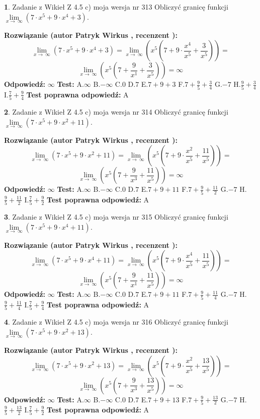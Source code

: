 \documentclass[12pt, a4paper]{article}
\theoremstyle{definition} %
\newtheorem{zad}{}
\newcommand{\zadStart}[1]{\begin{zad}#1\newline}
\newcommand{\zadStop}{\end{zad}}
\newcommand{\rozwStart}[2]{\noindent \textbf{Rozwiązanie (autor #1 , recenzent #2): }\newline}
\newcommand{\rozwStop}{\newline}
\newcommand{\odpStart}{\noindent \textbf{Odpowiedź:}\newline}
\newcommand{\odpStop}{\newline}
\newcommand{\testStart}{\noindent \textbf{Test:}\newline}
\newcommand{\testStop}{\newline}
\newcommand{\kluczStart}{\noindent \textbf{Test poprawna odpowiedź:}\newline}
\newcommand{\kluczStop}{\newline}
\begin{document}
\zadStart{Zadanie z Wikieł Z 4.5 c) moja wersja nr 313}
Obliczyć granicę funkcji  $\lim\limits_{x\to\ \infty}(7 \cdot x^{5}+9 \cdot x^{4}+3)$.
\zadStop
\rozwStart{Patryk Wirkus}{}
$$\lim\limits_{x\to\ \infty}(7 \cdot x^{5}+9 \cdot x^{4}+3) = \lim\limits_{x\to\ \infty}(x^{5}(7 +9 \cdot \frac{x^{4}}{x^{5}}+\frac{3}{x^{5}})) =$$ $$\lim\limits_{x\to\ \infty}(x^{5}(7 +\frac{9}{x^{1}}+\frac{3}{x^{5}})) =\infty$$
\rozwStop
\odpStart
$\infty$
\odpStop
\testStart
A.$\infty$ B.$-\infty$ C.$0$ D.$7$ E.$7 + 9 + 3$
F.$7+\frac{9}{5}+\frac{3}{4}$ G.$-7$
H.$\frac{9}{5}+\frac{3}{4}$
I.$\frac{7}{5}+\frac{9}{4}$
\testStop
\kluczStart
A
\kluczStop



\zadStart{Zadanie z Wikieł Z 4.5 c) moja wersja nr 314}
Obliczyć granicę funkcji  $\lim\limits_{x\to\ \infty}(7 \cdot x^{5}+9 \cdot x^{2}+11)$.
\zadStop
\rozwStart{Patryk Wirkus}{}
$$\lim\limits_{x\to\ \infty}(7 \cdot x^{5}+9 \cdot x^{2}+11) = \lim\limits_{x\to\ \infty}(x^{5}(7 +9 \cdot \frac{x^{2}}{x^{5}}+\frac{11}{x^{5}})) =$$ $$\lim\limits_{x\to\ \infty}(x^{5}(7 +\frac{9}{x^{3}}+\frac{11}{x^{5}})) =\infty$$
\rozwStop
\odpStart
$\infty$
\odpStop
\testStart
A.$\infty$ B.$-\infty$ C.$0$ D.$7$ E.$7 + 9 + 11$
F.$7+\frac{9}{5}+\frac{11}{2}$ G.$-7$
H.$\frac{9}{5}+\frac{11}{2}$
I.$\frac{7}{5}+\frac{9}{2}$
\testStop
\kluczStart
A
\kluczStop



\zadStart{Zadanie z Wikieł Z 4.5 c) moja wersja nr 315}
Obliczyć granicę funkcji  $\lim\limits_{x\to\ \infty}(7 \cdot x^{5}+9 \cdot x^{4}+11)$.
\zadStop
\rozwStart{Patryk Wirkus}{}
$$\lim\limits_{x\to\ \infty}(7 \cdot x^{5}+9 \cdot x^{4}+11) = \lim\limits_{x\to\ \infty}(x^{5}(7 +9 \cdot \frac{x^{4}}{x^{5}}+\frac{11}{x^{5}})) =$$ $$\lim\limits_{x\to\ \infty}(x^{5}(7 +\frac{9}{x^{1}}+\frac{11}{x^{5}})) =\infty$$
\rozwStop
\odpStart
$\infty$
\odpStop
\testStart
A.$\infty$ B.$-\infty$ C.$0$ D.$7$ E.$7 + 9 + 11$
F.$7+\frac{9}{5}+\frac{11}{4}$ G.$-7$
H.$\frac{9}{5}+\frac{11}{4}$
I.$\frac{7}{5}+\frac{9}{4}$
\testStop
\kluczStart
A
\kluczStop



\zadStart{Zadanie z Wikieł Z 4.5 c) moja wersja nr 316}
Obliczyć granicę funkcji  $\lim\limits_{x\to\ \infty}(7 \cdot x^{5}+9 \cdot x^{2}+13)$.
\zadStop
\rozwStart{Patryk Wirkus}{}
$$\lim\limits_{x\to\ \infty}(7 \cdot x^{5}+9 \cdot x^{2}+13) = \lim\limits_{x\to\ \infty}(x^{5}(7 +9 \cdot \frac{x^{2}}{x^{5}}+\frac{13}{x^{5}})) =$$ $$\lim\limits_{x\to\ \infty}(x^{5}(7 +\frac{9}{x^{3}}+\frac{13}{x^{5}})) =\infty$$
\rozwStop
\odpStart
$\infty$
\odpStop
\testStart
A.$\infty$ B.$-\infty$ C.$0$ D.$7$ E.$7 + 9 + 13$
F.$7+\frac{9}{5}+\frac{13}{2}$ G.$-7$
H.$\frac{9}{5}+\frac{13}{2}$
I.$\frac{7}{5}+\frac{9}{2}$
\testStop
\kluczStart
A
\kluczStop
\end{document}
